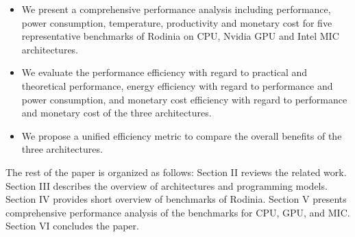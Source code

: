   
\begin{itemize}    
\item  We present a comprehensive performance analysis including performance, power consumption, temperature, productivity and monetary cost for five representative benchmarks of Rodinia on CPU, Nvidia GPU and Intel MIC architectures.    
\item  We evaluate the performance efficiency with regard to practical and theoretical performance, energy efficiency with regard to performance and power consumption, and monetary cost efficiency with regard to performance and monetary cost of the three architectures.    
\item  We propose a unified efficiency metric to compare the overall benefits of the three architectures.
\end{itemize}

The rest of the paper is organized as follows: Section II reviews the related work. Section III describes the overview of architectures and programming models. Section IV provides short overview of benchmarks of Rodinia. Section V presents comprehensive performance analysis of the benchmarks for CPU, GPU, and MIC. Section VI concludes the paper.
